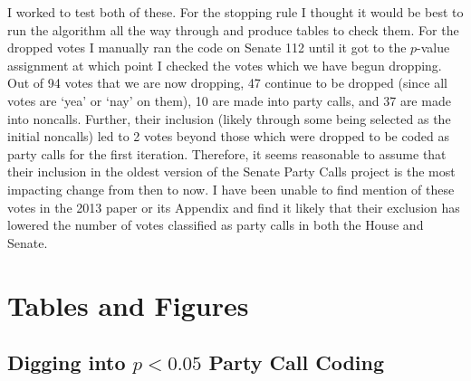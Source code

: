\documentclass[12pt]{article}
\begin{document}
I worked to test both of these. For the stopping rule I thought it would be best to run the algorithm all the way through and produce tables to check them. For the dropped votes I manually ran the code on Senate 112 until it got to the $p$-value assignment at which point I checked the votes which we have begun dropping. Out of 94 votes that we are now dropping, 47 continue to be dropped (since all votes are `yea' or `nay' on them), 10 are made into party calls, and 37 are made into noncalls. Further, their inclusion (likely through some being selected as the initial noncalls) led to 2 votes beyond those which were dropped to be coded as party calls for the first iteration. Therefore, it seems reasonable to assume that their inclusion in the oldest version of the Senate Party Calls project is the most impacting change from then to now. I have been unable to find mention of these votes in the 2013 paper or its Appendix and find it likely that their exclusion has lowered the number of votes classified as party calls in both the House and Senate.





\section{Tables and Figures}

\subsection{Digging into $ p < 0.05 $ Party Call Coding}

\end{document}
